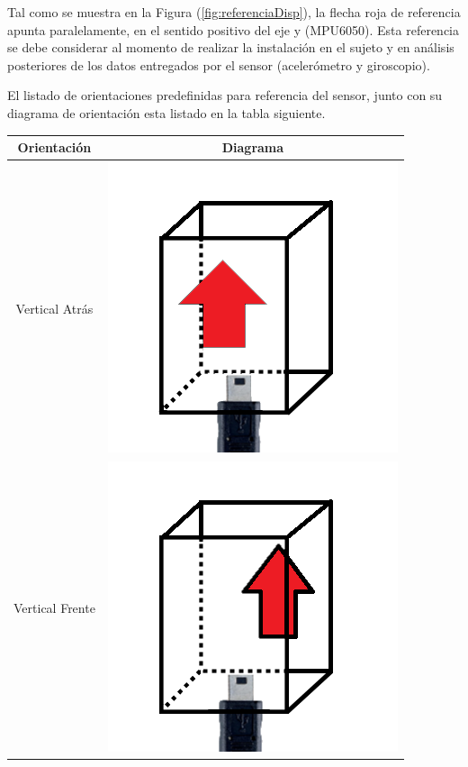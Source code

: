 \documentclass[12pt,a4paper]{article}
\begin{document}
Tal como se muestra en la Figura (\ref{fig:referenciaDisp}), la flecha roja de referencia apunta paralelamente, en el sentido positivo del eje y (MPU6050).
Esta referencia se debe considerar al momento de realizar la instalación en el sujeto y en análisis posteriores de los datos entregados por el sensor (acelerómetro y giroscopio).

\newpage

El listado de orientaciones predefinidas para referencia del sensor, junto con su diagrama de orientación esta listado en la tabla siguiente.

\begin{table}[H]
	\centering
	\begin{tabular}{|c|c|}
		\hline 
		\textbf{Orientación} & \textbf{Diagrama} \\ 
		\hline 
		Vertical Atrás &  \includegraphics[scale=0.2]{images/IMU/verticalatras}\\ 
		\hline 
		Vertical Frente  &  \includegraphics[scale=0.2]{images/IMU/verticalfrente} \\ 

\end{tabular}
\end{table}
\end{document}

